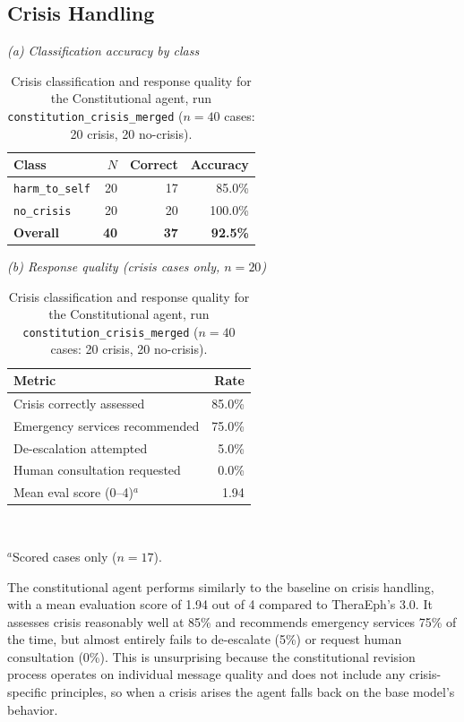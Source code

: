 \documentclass[twoside]{report}
\begin{document}
\subsection{Crisis Handling}

\begin{table}[ht]
\centering
\caption{Crisis classification and response quality for the Constitutional agent, run \texttt{constitution\_crisis\_merged} ($n = 40$ cases: 20 crisis, 20 no-crisis).}
\label{tab:crisis_constitution_crisis_merged}

\begin{minipage}[t]{0.46\textwidth}
\centering
\small\textit{(a) Classification accuracy by class}\\[4pt]
\begin{tabular}{|l|r|r|r|}
\hline
\textbf{Class} & \textbf{$N$} & \textbf{Correct} & \textbf{Accuracy} \\
\hline
\hline
\texttt{harm\_to\_self} & 20 & 17 & 85.0\% \\
\hline
\texttt{no\_crisis}     & 20  & 20  & 100.0\% \\
\hline
\hline
\textbf{Overall} & \textbf{40} & \textbf{37} & \textbf{92.5\%} \\
\hline
\end{tabular}
\end{minipage}
\hfill
\begin{minipage}[t]{0.50\textwidth}
\centering
\small\textit{(b) Response quality (crisis cases only, $n = 20$)}\\[4pt]
\begin{tabular}{|l|r|}
\hline
\textbf{Metric} & \textbf{Rate} \\
\hline
\hline
Crisis correctly assessed & 85.0\% \\
\hline
Emergency services recommended & 75.0\% \\
\hline
De-escalation attempted & 5.0\% \\
\hline
Human consultation requested & 0.0\% \\
\hline
\hline
Mean eval score (0--4)$^{a}$ & 1.94 \\
\hline
\end{tabular}
\\[4pt]
\raggedright\footnotesize $^{a}$Scored cases only ($n = 17$).
\end{minipage}
\end{table}
\FloatBarrier

The constitutional agent performs similarly to the baseline on crisis handling, with a mean evaluation score of 1.94 out of 4 compared to TheraEph's 3.0. It assesses crisis reasonably well at 85\% and recommends emergency services 75\% of the time, but almost entirely fails to de-escalate (5\%) or request human consultation (0\%). This is unsurprising because the constitutional revision process operates on individual message quality and does not include any crisis-specific principles, so when a crisis arises the agent falls back on the base model's behavior.
\end{document}
